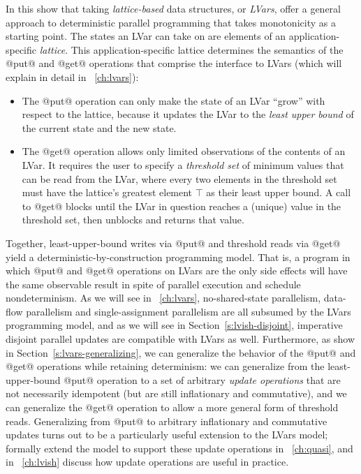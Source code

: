 In this  show that taking \emph{lattice-based} data
structures, or \emph{LVars}, offer a general approach to deterministic
parallel programming that takes monotonicity as a starting point. The
states an LVar can take on are elements of an application-specific
\emph{lattice}.  This application-specific lattice determines the
semantics of the @put@ and @get@ operations that comprise the
interface to LVars (which  will explain in detail in
~\ref{ch:lvars}):
\begin{itemize}
\item The @put@ operation can only make the state of an LVar ``grow''
  with respect to the lattice, because it updates the LVar to the
  \emph{least upper bound} of the current state and the new state.
\item The @get@ operation allows only limited observations of the
  contents of an LVar.  It requires the user to specify a
  \emph{threshold set} of minimum values that can be read from the
  LVar, where every two elements in the threshold set must have the
  lattice's greatest element $\top$ as their least upper bound.  A
  call to @get@ blocks until the LVar in question reaches a (unique)
  value in the threshold set, then unblocks and returns that value.
\end{itemize}
Together, least-upper-bound writes via @put@ and threshold reads via
@get@ yield a deterministic-by-construction programming model.  That
is, a program in which @put@ and @get@ operations on LVars are the
only side effects will have the same observable result in spite of
parallel execution and schedule nondeterminism.  As we will see in ~\ref{ch:lvars}, no-shared-state parallelism, data-flow
parallelism and single-assignment parallelism are all subsumed by the
LVars programming model, and as we will see in
Section~\ref{s:lvish-disjoint}, imperative disjoint parallel updates
are compatible with LVars as well.  Furthermore, as  show in
Section~\ref{s:lvars-generalizing}, we can generalize the behavior of
the @put@ and @get@ operations while retaining determinism: we can
generalize from the least-upper-bound @put@ operation to a set of
arbitrary \emph{update operations} that are not necessarily idempotent
(but are still inflationary and commutative), and we can generalize
the @get@ operation to allow a more general form of threshold reads.
Generalizing from @put@ to arbitrary inflationary and commutative
updates turns out to be a particularly useful extension to the LVars
model;  formally extend the model to support these update operations
in ~\ref{ch:quasi}, and in ~\ref{ch:lvish}  discuss how
update operations are useful in practice.

